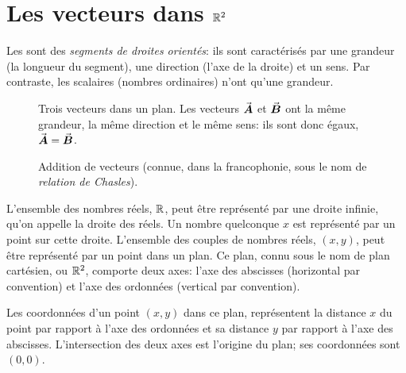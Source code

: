 \section{Les vecteurs dans $\mathbb{R}^2$}
%
Les  sont des \textit{segments de droites orientés}:
ils sont caractérisés par une grandeur (la longueur du segment), une direction
(l'axe de la droite) et un sens.  Par contraste, les scalaires (nombres ordinaires)
n'ont qu'une grandeur.

\begin{figure}[h]
\begin{minipage}{0.45\textwidth}
\caption{Trois vecteurs dans un plan. Les vecteurs $\vec{\boldsymbol{\boldsymbol{A}}}$ et $\vec{\boldsymbol{\boldsymbol{B}}}$ ont la même grandeur, la même direction et le même sens: ils sont donc égaux, $\vec{\boldsymbol{A}}=\vec{\boldsymbol{B}}$.}
\end{minipage}\hfill
\begin{minipage}{0.45\textwidth}
\caption{Addition de vecteurs (connue, dans la francophonie, sous le nom de \textit{relation de Chasles}).}
\end{minipage}
\end{figure}


L'ensemble des nombres réels, $\mathbb{R}$, peut être représenté par une droite infinie, qu'on
appelle la droite des réels.  Un nombre quelconque $x$ est représenté par
un point sur cette droite.
L'ensemble des couples de nombres réels, $ (x, y) $, peut être représenté par
un point dans un plan.  Ce plan, connu sous  le nom de plan cartésien,
ou $\mathbb{R}^2$,
comporte deux axes: l'axe des abscisses (horizontal par convention)  et l'axe des ordonnées (vertical par convention).


Les coordonnées d'un point $(x, y) $ dans ce plan, représentent la distance $x$
du point par rapport à l'axe des ordonnées et sa distance $y$ par rapport à l'axe
des abscisses.  L'intersection des deux axes est l'origine du plan; ses coordonnées
sont $(0, 0)$.

